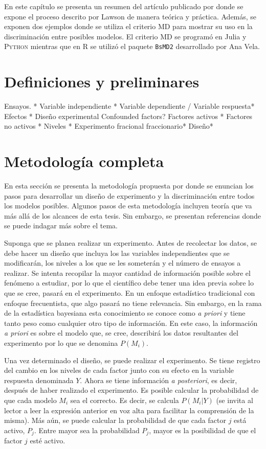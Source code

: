 En este capítulo se presenta un resumen del artículo publicado por \cite{meyer1996} donde se expone el proceso descrito por Lawson de manera teórica y práctica. Además, se exponen dos ejemplos donde se utiliza el criterio MD para mostrar su uso en la discriminación entre posibles modelos. El criterio MD se programó en \textsf{Julia} y \textsc{Python} mientras que en \textsf{R} se utilizó el paquete \texttt{BsMD2} desarrollado por Ana Vela. 

\section{Definiciones y preliminares}

Ensayos. *
Variable independiente *
Variable dependiente / Variable respuesta*
Efectos *
Diseño experimental
Confounded factors?
Factores activos *
Factores no activos *
Niveles *
Experimento fracional fraccionario*
Diseño*

\section{Metodología completa}

En esta sección se presenta la metodología propuesta por \cite{meyer1996} donde se enuncian los pasos para desarrollar un diseño de experimento y la discriminación entre todos los modelos posibles. Algunos pasos de esta metodología incluyen teoría que va más allá de los alcances de esta tesis. Sin embargo, se presentan referencias donde se puede indagar más sobre el tema. 

Suponga que se planea realizar un experimento. Antes de recolectar los datos, se debe hacer un diseño que incluya los las variables independientes que se modificarán, los niveles a los que se les someterán y el número de ensayos a realizar. Se intenta recopilar la mayor cantidad de información posible sobre el fenómeno a estudiar, por lo que el científico debe tener una idea previa sobre lo que se cree, pasará en el experimento. En un enfoque estadístico tradicional con enfoque frecuentista,  que algo pasará no tiene relevancia. Sin embargo, en la rama de la estadística bayesiana esta conocimiento se conoce como \textit{a priori} y tiene tanto peso como cualquier otro tipo de información. En este caso, la información \textit{a priori} es sobre el modelo que, se cree, describirá los datos resultantes del experimento por lo que se denomina $P(M_i)$. 

Una vez determinado el diseño, se puede realizar el experimento. Se tiene registro del cambio en los niveles de cada factor junto con su efecto en la variable respuesta denominada $Y$. Ahora se tiene información \textit{a posteriori}, es decir, después de haber realizado el experimento. Es posible calcular la probabilidad de que cada modelo $M_i$ sea el correcto. Es decir, se calcula $P(M_i | Y)$ (se invita al lector a leer la expresión anterior en voz alta para facilitar la comprensión de la misma). Más aún, se puede calcular la probabilidad de que cada factor $j$ está activo, $P_j$. Entre mayor sea la probabilidad $P_j$, mayor es la posibilidad de que el factor $j$ esté activo. 

